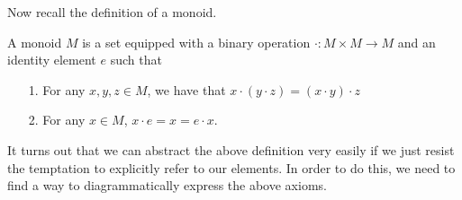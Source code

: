 Now recall the definition of a monoid.
\begin{definition}
    A monoid $M$ is a set equipped with a binary operation $\cdot: M \times M \to M$ 
    and an identity element $e$ such that 
    \begin{itemize}
        \item[1.] For any $x, y, z \in M$, we have that $x \cdot (y \cdot z) = (x \cdot y) \cdot z$ 
        \item[2.] For any $x \in M$, $x \cdot e = x = e \cdot x$.  
    \end{itemize}
\end{definition} 
It turns out that we can abstract the above definition very easily if we just resist the 
temptation to explicitly refer to our elements. In order to do this, we need 
to find a way to diagrammatically express the above axioms. 

